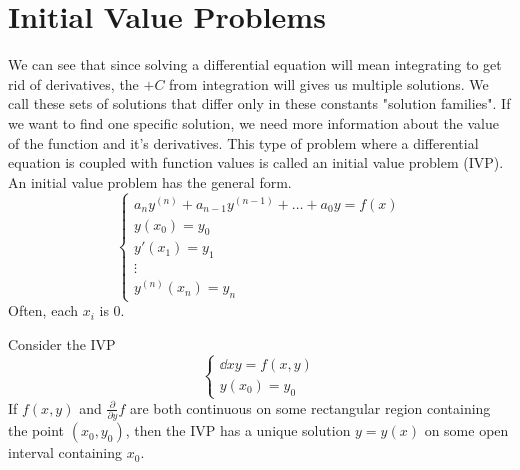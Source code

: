 \section{Initial Value Problems}
\noindent
We can see that since solving a differential equation will mean integrating to get rid of derivatives, the $+ C$ from integration will gives us multiple solutions. We call these sets of solutions that differ only in these constants "solution families". If we want to find one specific solution, we need more information about the value of the function and it's derivatives. This type of problem where a differential equation is coupled with function values is called an initial value problem (IVP).\\

\noindent
An initial value problem has the general form.
\begin{equation*}
	\begin{cases}
		a_ny^{(n)} + a_{n-1}y^{(n-1)} + \ldots + a_0y = f(x) \\
		y(x_0) = y_0 \\
		y'(x_1) = y_1 \\
		\vdots \\
		y^{(n)}(x_n) = y_n
	\end{cases}
\end{equation*}
Often, each $x_i$ is 0.



\begin{theorem}
	Consider the IVP
	\begin{equation*}
		\begin{cases}
			\dd{x}{y} = f(x,y) \\
			y(x_0) = y_0
		\end{cases}
	\end{equation*}
	If $f(x,y)$ and $\frac{\partial}{\partial y}f$ are both continuous on some rectangular region containing the point $(x_0, y_0)$, then the IVP has a unique solution $y = y(x)$ on some open interval containing $x_0$.
\end{theorem}

